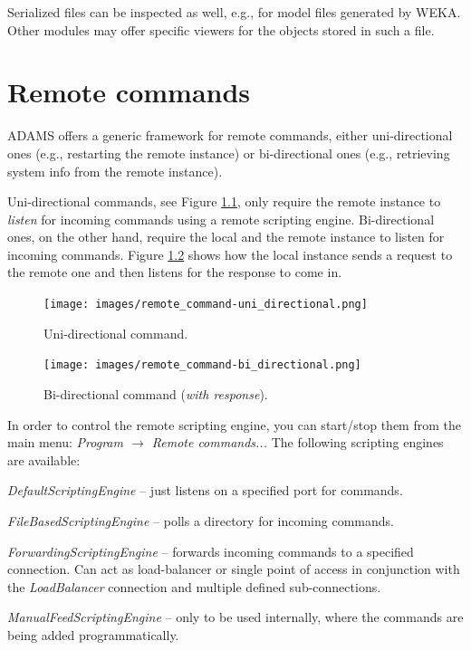 Serialized files can be inspected as well, e.g., for model files generated 
by WEKA. Other modules may offer specific viewers for the objects stored
in such a file.


\chapter{Remote commands}

ADAMS offers a generic framework for remote commands, either uni-directional
ones (e.g., restarting the remote instance) or bi-directional ones
(e.g., retrieving system info from the remote instance).

Uni-directional commands, see Figure \ref{remote_command-uni_directional},
only require the remote instance to \textit{listen} for incoming commands
using a remote scripting engine. Bi-directional ones, on the other hand,
require the local and the remote instance to listen for incoming commands.
Figure \ref{remote_command-bi_directional} shows how the local instance
sends a request to the remote one and then listens for the response to
come in.

\begin{figure}[htb]
  \centering
  \texttt{[image: images/remote\_command-uni\_directional.png]}
  \caption{Uni-directional command.}
  \label{remote_command-uni_directional}
\end{figure}

\begin{figure}[htb]
  \centering
  \texttt{[image: images/remote\_command-bi\_directional.png]}
  \caption{Bi-directional command (\textit{with response}).}
  \label{remote_command-bi_directional}
\end{figure}

In order to control the remote scripting engine, you can start/stop them
from the main menu: \textit{Program $\rightarrow$ Remote commands...}
The following scripting engines are available:
\begin{tight_itemize}
  \item \textit{DefaultScriptingEngine} -- just listens on a specified
  port for commands.
  \item \textit{FileBasedScriptingEngine} -- polls a directory for incoming
  commands.
  \item \textit{ForwardingScriptingEngine} -- forwards incoming commands
  to a specified connection. Can act as load-balancer or single point of access
  in conjunction with the \textit{LoadBalancer} connection and multiple defined
  sub-connections.
  \item \textit{ManualFeedScriptingEngine} -- only to be used internally, where
  the commands are being added programmatically.
\end{tight_itemize}


